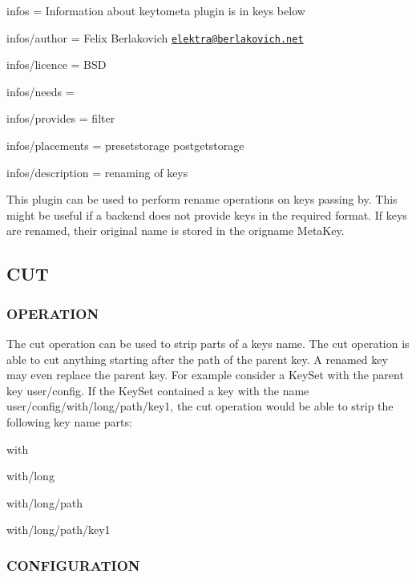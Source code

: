 
\begin{DoxyItemize}
\item infos = Information about keytometa plugin is in keys below
\item infos/author = Felix Berlakovich \href{mailto:elektra@berlakovich.net}{\tt elektra@berlakovich.\+net}
\item infos/licence = B\+S\+D
\item infos/needs =
\item infos/provides = filter
\item infos/placements = presetstorage postgetstorage
\item infos/description = renaming of keys
\end{DoxyItemize}

This plugin can be used to perform rename operations on keys passing by. This might be useful if a backend does not provide keys in the required format. If keys are renamed, their original name is stored in the {\ttfamily origname} Meta\+Key.

\subsection*{C\+U\+T}

\subsubsection*{O\+P\+E\+R\+A\+T\+I\+O\+N}

The cut operation can be used to strip parts of a keys name. The cut operation is able to cut anything starting after the path of the parent key. A renamed key may even replace the parent key. For example consider a Key\+Set with the parent key {\ttfamily user/config}. If the Key\+Set contained a key with the name {\ttfamily user/config/with/long/path/key1}, the cut operation would be able to strip the following key name parts\+:
\begin{DoxyItemize}
\item with
\item with/long
\item with/long/path
\item with/long/path/key1
\end{DoxyItemize}

\subsubsection*{C\+O\+N\+F\+I\+G\+U\+R\+A\+T\+I\+O\+N}

